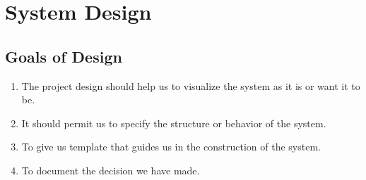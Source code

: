\chapter{System Design}
\section{Goals of Design}
\begin{enumerate}
 \item The project design should help us to visualize the system as it is or want it to be.
 \item It should permit us to specify the structure or behavior of the system.
 \item To give us template that guides us in the construction of the system.
 \item To document the decision we have made.
\end{enumerate}

